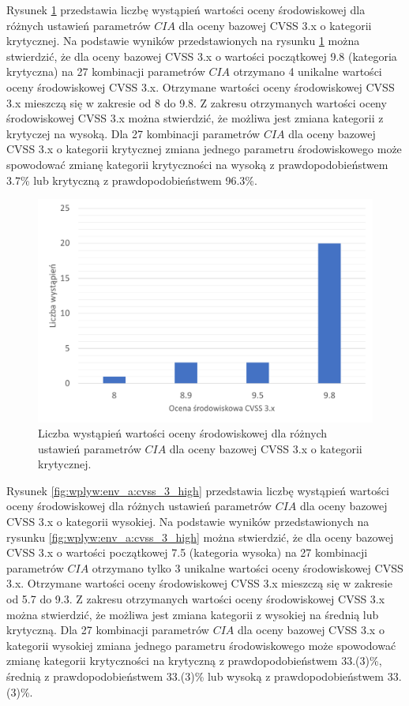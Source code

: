 \bigbreak
Rysunek \ref{fig:wplyw:env_a:cvss_3_critical} przedstawia liczbę wystąpień wartości oceny środowiskowej dla różnych ustawień parametrów $CIA$ dla oceny bazowej CVSS 3.x o kategorii krytycznej. Na podstawie wyników przedstawionych na rysunku \ref{fig:wplyw:env_a:cvss_3_critical} można stwierdzić, że dla oceny bazowej CVSS 3.x o wartości początkowej 9.8 (kategoria krytyczna) na 27 kombinacji parametrów $CIA$ otrzymano 4 unikalne wartości oceny środowiskowej CVSS 3.x. Otrzymane wartości oceny środowiskowej CVSS 3.x mieszczą się w zakresie od 8 do 9.8. Z zakresu otrzymanych wartości oceny środowiskowej CVSS 3.x można stwierdzić, że możliwa jest zmiana kategorii z krytyczej na wysoką. Dla 27 kombinacji parametrów $CIA$ dla oceny bazowej CVSS 3.x o kategorii krytycznej zmiana jednego parametru środowiskowego może spowodować zmianę kategorii krytyczności na wysoką z prawdopodobieństwem 3.7\% lub krytyczną z prawdopodobieństwem 96.3\%.

\begin{figure}[!ht]
\centering
\includegraphics[width=.9\textwidth]{Chapters/Wplyw/cvss3/cvss_3_critical.pdf}
\caption{Liczba wystąpień wartości oceny środowiskowej dla różnych ustawień parametrów $CIA$ dla oceny bazowej CVSS 3.x o kategorii krytycznej.}
\label{fig:wplyw:env_a:cvss_3_critical}
\end{figure}

\bigbreak
Rysunek \ref{fig:wplyw:env_a:cvss_3_high} przedstawia liczbę wystąpień wartości oceny środowiskowej dla różnych ustawień parametrów $CIA$ dla oceny bazowej CVSS 3.x o kategorii wysokiej. Na podstawie wyników przedstawionych na rysunku \ref{fig:wplyw:env_a:cvss_3_high} można stwierdzić, że dla oceny bazowej CVSS 3.x o wartości początkowej 7.5 (kategoria wysoka) na 27 kombinacji parametrów $CIA$ otrzymano tylko 3 unikalne wartości oceny środowiskowej CVSS 3.x. Otrzymane wartości oceny środowiskowej CVSS 3.x mieszczą się w zakresie od 5.7 do 9.3. Z zakresu otrzymanych wartości oceny środowiskowej CVSS 3.x można stwierdzić, że możliwa jest zmiana kategorii z wysokiej na średnią lub krytyczną. Dla 27 kombinacji parametrów $CIA$ dla oceny bazowej CVSS 3.x o kategorii wysokiej zmiana jednego parametru środowiskowego może spowodować zmianę kategorii krytyczności na krytyczną z prawdopodobieństwem 33.(3)\%, średnią z prawdopodobieństwem 33.(3)\% lub wysoką z prawdopodobieństwem 33.(3)\%.


